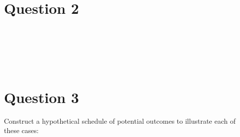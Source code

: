 \documentclass[11pt,notitlepage]{article}\usepackage[]{graphicx}\usepackage[]{color}
\makeatletter
\newenvironment{kframe}{%
 \def\at@end@of@kframe{}%
 \ifinner\ifhmode%
  \def\at@end@of@kframe{\end{minipage}}%
  \begin{minipage}{\columnwidth}%
 \fi\fi%
 \def\FrameCommand##1{\hskip\@totalleftmargin \hskip-\fboxsep
 \colorbox{shadecolor}{##1}\hskip-\fboxsep
     \hskip-\linewidth \hskip-\@totalleftmargin \hskip\columnwidth}%
 \MakeFramed {\advance\hsize-\width
   \@totalleftmargin\z@ \linewidth\hsize
   \@setminipage}}%
 {\par\unskip\endMakeFramed%
 \at@end@of@kframe}
\newenvironment{knitrout}{}{} %
\makeatother
\begin{document}
\section*{Question 2}
\begin{knitrout}
\color{fgcolor}\begin{kframe}
\begin{verbatim}






\end{verbatim}
\end{kframe}
\end{knitrout}



\section*{Question 3}
Construct a hypothetical schedule of potential outcomes to illustrate each of these cases:
\end{document}
